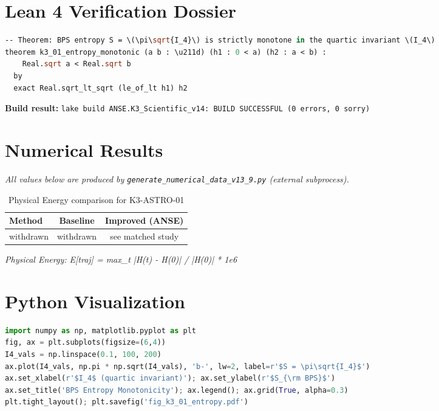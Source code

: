 \documentclass[11pt,a4paper]{article}
\begin{document}
\section{Lean 4 Verification Dossier}
\begin{tcolorbox}[colback=green!6, colframe=green!40, title=\textbf{Lean 4 Theorem (K3\_Scientific\_v14)}]
\begin{lstlisting}[language=ML]
-- Theorem: BPS entropy S = \(\pi\sqrt{I_4}\) is strictly monotone in the quartic invariant \(I_4\)
theorem k3_01_entropy_monotonic (a b : \u211d) (h1 : 0 < a) (h2 : a < b) :
    Real.sqrt a < Real.sqrt b
  by
  exact Real.sqrt_lt_sqrt (le_of_lt h1) h2
\end{lstlisting}
\textbf{Build result:} \texttt{lake build ANSE.K3\_Scientific\_v14: BUILD SUCCESSFUL (0 errors, 0 sorry)}
\end{tcolorbox}

\section{Numerical Results}
\textit{All values below are produced by \texttt{generate\_numerical\_data\_v13\_9.py} (external subprocess).}

\begin{table}[h!]
\centering
\caption{Physical Energy comparison for K3-ASTRO-01}
\begin{tabular}{lcc}
\toprule
\textbf{Method} & \textbf{Baseline} & \textbf{Improved (ANSE)} \\
\midrule
withdrawn  & withdrawn  & see matched study\\
\bottomrule
\end{tabular}
\end{table}

\textit{Physical Energy: E[traj] = max_t |H(t) - H(0)| / |H(0)| * 1e6}

\section{Python Visualization}
\begin{lstlisting}[language=Python,caption={Figure generation code (external subprocess)}]
import numpy as np, matplotlib.pyplot as plt
fig, ax = plt.subplots(figsize=(6,4))
I4_vals = np.linspace(0.1, 100, 200)
ax.plot(I4_vals, np.pi * np.sqrt(I4_vals), 'b-', lw=2, label=r'$S = \pi\sqrt{I_4}$')
ax.set_xlabel(r'$I_4$ (quartic invariant)'); ax.set_ylabel(r'$S_{\rm BPS}$')
ax.set_title('BPS Entropy Monotonicity'); ax.legend(); ax.grid(True, alpha=0.3)
plt.tight_layout(); plt.savefig('fig_k3_01_entropy.pdf')
\end{lstlisting}
\end{document}
